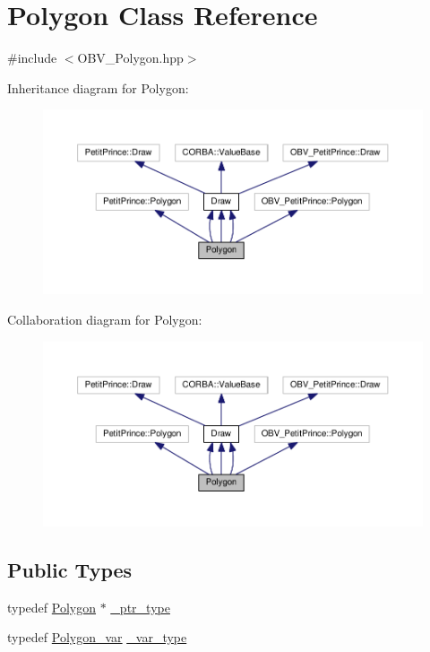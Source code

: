 \hypertarget{class_polygon}{}\section{Polygon Class Reference}
\label{class_polygon}


{\ttfamily \#include $<$O\+B\+V\+\_\+\+Polygon.\+hpp$>$}



Inheritance diagram for Polygon\+:
\nopagebreak
\begin{figure}[H]
\begin{center}
\leavevmode
\includegraphics[width=350pt]{class_polygon__inherit__graph}
\end{center}
\end{figure}


Collaboration diagram for Polygon\+:
\nopagebreak
\begin{figure}[H]
\begin{center}
\leavevmode
\includegraphics[width=350pt]{class_polygon__coll__graph}
\end{center}
\end{figure}
\subsection*{Public Types}
\begin{DoxyCompactItemize}
\item 
typedef \hyperlink{class_polygon}{Polygon} $\ast$ \hyperlink{class_polygon_aeef4c9b11b0fb5fcb4c33aa181da7791}{\+\_\+ptr\+\_\+type}
\item 
typedef \hyperlink{_petit_prince_8hpp_a38c44f0def6ea90dd03bbb5e8f6b7713}{Polygon\+\_\+var} \hyperlink{class_polygon_aae841b2b5d390f037539fc5307bc50f6}{\+\_\+var\+\_\+type}
\end{DoxyCompactItemize}
